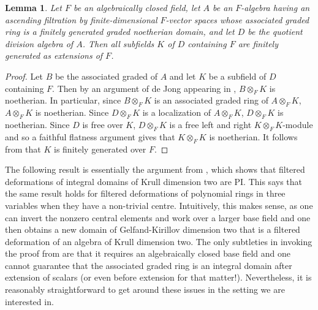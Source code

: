 \documentclass[a4paper,11pt,twoside,notitlepage,reqno]{amsart}
\theoremstyle{plain}
\numberwithin{thm}{section}
\newtheorem{lemma}[thm]{Lemma}
\theoremstyle{definition}
\begin{document}
\begin{lemma} Let $F$ be an algebraically closed field, let $A$ be an $F$-algebra having an ascending filtration by finite-dimensional $F$-vector spaces whose associated graded ring is a finitely generated graded noetherian domain, and let $D$ be the quotient division algebra of $A$.  Then all subfields $K$ of $D$ containing $F$ are finitely generated as extensions of $F$.
\label{lem:vamos}
\end{lemma}
\begin{proof}
Let $B$ be the associated graded of $A$ and let $K$ be a subfield of $D$ containing $F$.  Then by an argument of de Jong appearing in \cite[Theorem 5.1]{ASZ}, $B\otimes_F K$ is noetherian.  In particular, since $B\otimes_F K$ is an associated graded ring of $A\otimes_F K$, $A\otimes_F K$ is noetherian.  Since $D\otimes_F K$ is a localization of $A\otimes_F K$, $D\otimes_F K$ is noetherian. Since $D$ is free over $K$, $D\otimes_F K$ is a free left and right $K\otimes_F K$-module and so a faithful flatness argument gives that $K\otimes_F K$ is noetherian.  It follows from \cite{Vam} that $K$ is finitely generated over $F$.
\end{proof}
The following result is essentially the argument from \cite{Bell}, which shows that filtered deformations of integral domains of Krull dimension two are PI.  This says that the same result holds for filtered deformations of polynomial rings in three variables when they have a non-trivial centre.  Intuitively, this makes sense, as one can invert the nonzero central elements and work over a larger base field and one then obtains a new domain of Gelfand-Kirillov dimension two that is a filtered deformation of an algebra of Krull dimension two.  The only subtleties in invoking the proof from \cite{Bell} are that it requires an algebraically closed base field and one cannot guarantee that the associated graded ring is an integral domain after extension of scalars (or even before extension for that matter!). Nevertheless, it is reasonably straightforward to get around these issues in the setting we are interested in.  
\end{document}
